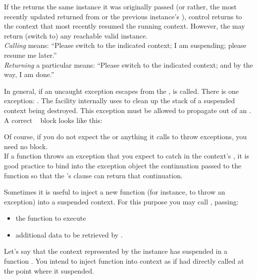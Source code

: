 If the \entryfn returns the same \cont instance it was originally
passed (or rather, the most recently updated \cont returned from \callcc or the
previous instance's \resume), control returns to the context that most
recently resumed the running context. However, the \entryfn may return (switch
to) any reachable valid \cont instance.\\

\emph{Calling} \contresume means: ``Please switch to the indicated context; I
am suspending; please resume me later.''\\

\emph{Returning} a particular \cont means: ``Please switch to the indicated
context; and by the way, I am done.''


\label{subsec:exceptions}
In general, if an uncaught exception escapes from
the \entryfn,  is called. There is one
exception: \unwindex. The \callcc facility internally uses \unwindex to clean
up the stack of a suspended context being destroyed. This exception must be
allowed to propagate out of an \entryfn.\\

A correct \entryfn\  block looks like this:

Of course, if you do not expect the \entryfn or anything it calls to throw
exceptions, you need no  block.\\

If a \resumewith function throws an exception that you expect to catch in the
context's \entryfn, it is good practice to bind into the exception object the
continuation passed to the \resumewith function so that
the \entryfn's  clause can return that continuation.

\label{subsec:resumewith}
Sometimes it is useful to inject a new function (for instance, to throw an
exception) into a suspended context. For this purpose you may call
, passing:

\begin{itemize}
  \item the function  to execute
  \item additional data  to be retrieved by .
\end{itemize}

Let's say that the context represented by the \cont instance  has
suspended in a function . You intend to inject
function  into context  as if  had directly
called  at the point where it suspended.\\

